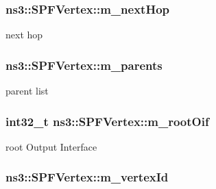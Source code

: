 \subsubsection[{\texorpdfstring{m\+\_\+next\+Hop}{m_nextHop}}]{ ns3\+::\+S\+P\+F\+Vertex\+::m\+\_\+next\+Hop\hspace{0.3cm}{\ttfamily [private]}}\hypertarget{classns3_1_1SPFVertex_a1012ff41d6143a2d4fb467b5bf2fbfab}{}\label{classns3_1_1SPFVertex_a1012ff41d6143a2d4fb467b5bf2fbfab}


next hop 

\subsubsection[{\texorpdfstring{m\+\_\+parents}{m_parents}}]{ ns3\+::\+S\+P\+F\+Vertex\+::m\+\_\+parents\hspace{0.3cm}{\ttfamily [private]}}\hypertarget{classns3_1_1SPFVertex_af644854d7d83ccd2200a657dceaea0f8}{}\label{classns3_1_1SPFVertex_af644854d7d83ccd2200a657dceaea0f8}


parent list 

\subsubsection[{\texorpdfstring{m\+\_\+root\+Oif}{m_rootOif}}]{\setlength{\rightskip}{0pt plus 5cm}int32\+\_\+t ns3\+::\+S\+P\+F\+Vertex\+::m\+\_\+root\+Oif\hspace{0.3cm}{\ttfamily [private]}}\hypertarget{classns3_1_1SPFVertex_aa6261717badceedb17b565549a86f14d}{}\label{classns3_1_1SPFVertex_aa6261717badceedb17b565549a86f14d}


root Output Interface 

\subsubsection[{\texorpdfstring{m\+\_\+vertex\+Id}{m_vertexId}}]{ ns3\+::\+S\+P\+F\+Vertex\+::m\+\_\+vertex\+Id\hspace{0.3cm}{\ttfamily [private]}}\hypertarget{classns3_1_1SPFVertex_adb37c35d8a95e05cc72bb9f8821dc3d3}{}\label{classns3_1_1SPFVertex_adb37c35d8a95e05cc72bb9f8821dc3d3}


